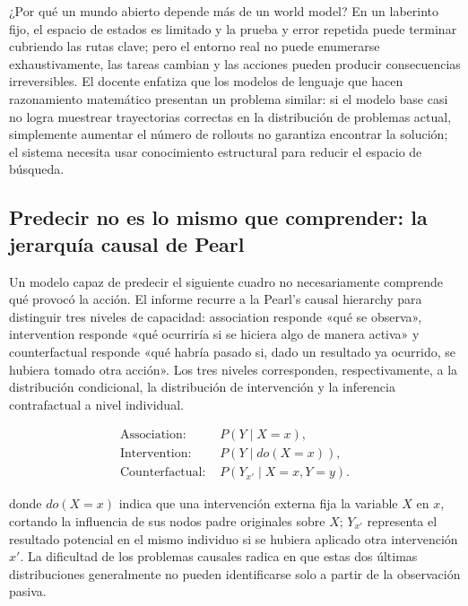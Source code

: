 ¿Por qué un mundo abierto depende más de un world model? En un laberinto fijo, el espacio de estados es limitado y la prueba y error repetida puede terminar cubriendo las rutas clave; pero el entorno real no puede enumerarse exhaustivamente, las tareas cambian y las acciones pueden producir consecuencias irreversibles. El docente enfatiza que los modelos de lenguaje que hacen razonamiento matemático presentan un problema similar: si el modelo base casi no logra muestrear trayectorias correctas en la distribución de problemas actual, simplemente aumentar el número de rollouts no garantiza encontrar la solución; el sistema necesita usar conocimiento estructural para reducir el espacio de búsqueda.


\subsection{Predecir no es lo mismo que comprender: la jerarquía causal de Pearl}

Un modelo capaz de predecir el siguiente cuadro no necesariamente comprende qué provocó la acción. El informe recurre a la Pearl's causal hierarchy para distinguir tres niveles de capacidad: association responde «qué se observa», intervention responde «qué ocurriría si se hiciera algo de manera activa» y counterfactual responde «qué habría pasado si, dado un resultado ya ocurrido, se hubiera tomado otra acción». Los tres niveles corresponden, respectivamente, a la distribución condicional, la distribución de intervención y la inferencia contrafactual a nivel individual.

$$
\begin{aligned}
\text{Association: }& P(Y\mid X=x),\\
\text{Intervention: }& P(Y\mid do(X=x)),\\
\text{Counterfactual: }& P(Y_{x'}\mid X=x,Y=y).
\end{aligned}
$$

donde $do(X=x)$ indica que una intervención externa fija la variable $X$ en $x$, cortando la influencia de sus nodos padre originales sobre $X$; $Y_{x'}$ representa el resultado potencial en el mismo individuo si se hubiera aplicado otra intervención $x'$. La dificultad de los problemas causales radica en que estas dos últimas distribuciones generalmente no pueden identificarse solo a partir de la observación pasiva.

